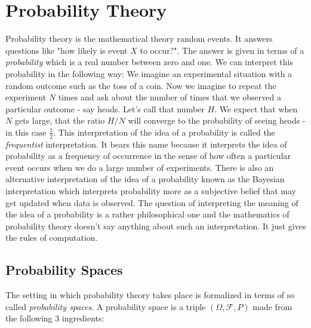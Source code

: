 \section{Probability Theory}
Probability theory is the mathematical theory random events. It answers questions like "how likely is event $X$ to occur?". The answer is given in terms of a \emph{probability} which is a real number between zero and one. We can interpret this probability in the following way: We imagine an experimental situation with a random outcome such as the toss of a coin. Now we imagine to repeat the experiment $N$ times and ask about the number of times that we observed a particular outcome - say heads. Let's call that number $H$. We expect that when $N$ gets large, that the ratio $H/N$ will converge to the probability of seeing heads - in this case $\frac{1}{2}$. This interpretation of the idea of a probability is called the \emph{frequentist} interpretation. It bears this name because it interprets the idea of probability as a frequency of occurrence in the sense of how often a particular event occurs when we do a large number of experiments. There is also an alternative interpretation of the idea of a probability known as the Bayesian interpretation which interprets probability more as a subjective belief that may get updated when data is observed. The question of interpreting the meaning of the idea of a probability is a rather philosophical one and the mathematics of probability theory doesn't say anything about such an interpretation. It just gives the rules of computation.  




\subsection{Probability Spaces}
The setting in which probability theory takes place is formalized in terms of so called \emph{probability spaces}. A probability space is a triple $(\Omega, \mathcal{F}, P)$ made from the following 3 ingredients: 

